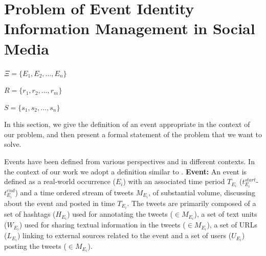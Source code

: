 \section{Problem of Event Identity Information Management in Social Media\label{problem}}



$\Xi = \{E_{1},E_{2}, ... ,E_{n}\}$

$R = \{r_{1},r_{2}, ... ,r_{m}\}$

$S = \{s_{1},s_{2}, ... ,s_{n}\}$

In this section, we give the definition of an event appropriate in the context of our problem, and then present a formal statement of the problem that we want to solve.

Events have been defined from various perspectives and in different contexts. In the context of our work we adopt a definition similar to \cite{becker2011beyond}. \textbf{Event:} An event is defined as a real-world occurrence ($\scriptstyle E_{i}$) with an associated time period $\scriptstyle T_{E_{i}}$ ($\scriptstyle t^{start}_{E_{i}}$-$\scriptstyle t^{end}_{E_{i}}$) and a time ordered stream of tweets $\scriptstyle M_{E_{i}}$, of substantial volume, discussing about the event and posted in time $\scriptstyle T_{E_{i}}$.
The tweets are primarily composed of a set of hashtags ($\scriptstyle H_{E_{i}}$) used for annotating the tweets ($\scriptstyle \in M_{E_{i}}$), a set of text units ($\scriptstyle W_{E_{i}}$) used for sharing textual information in the tweets ($\scriptstyle \in M_{E_{i}}$), a set of URLs ($\scriptstyle L_{E_{i}}$) linking to external sources related to the event and a  set of users ($\scriptstyle U_{E_{i}}$) posting the tweets ($\scriptstyle \in M_{E_{i}}$).

